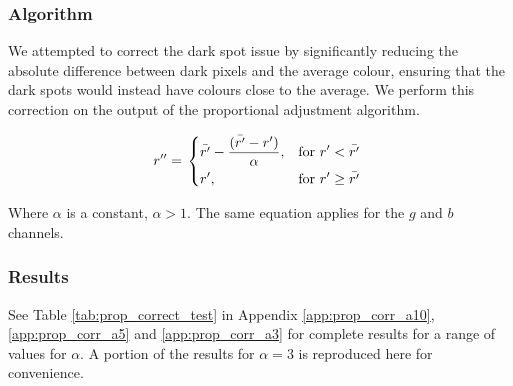 \subsubsection*{Algorithm}
We attempted to correct the dark spot issue by significantly reducing the absolute difference between dark pixels and the average colour, ensuring that the dark spots would instead have colours close to the average. We perform this correction on the output of the proportional adjustment algorithm.

\begin{equation} \label{eq:prop_corr_algo}
  r'' = \left.
  \begin{dcases}
    \displaystyle \bar{r'} - \frac{(\bar{r'} - r')}{\alpha}, & \text{for } r' < \bar{r'} \\
    \displaystyle r', & \text{for } r' \geq \bar{r'} \\
  \end{dcases}
  \right.\\
\end{equation}


Where $\alpha$ is a constant, $\alpha  > 1$. The same equation applies for the $g$ and $b$ channels.

\subsubsection*{Results}
See Table \ref{tab:prop_correct_test} in Appendix \ref{app:prop_corr_a10}, \ref{app:prop_corr_a5} and \ref{app:prop_corr_a3} for complete results for a range of values for $\alpha$. A portion of the results for $\alpha = 3$ is reproduced here for convenience.

